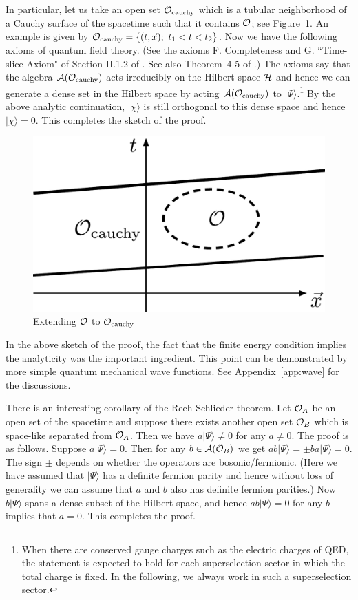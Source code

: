 \documentclass[12pt,a4paper]{article}
\theoremstyle{plain}
\theoremstyle{definition}
\numberwithin{thm}{section}
\newcommand{\ket}[1]{ | {#1} \rangle }
\def\CA{{\cal A}}
\def\CH{{\cal H}}
\def\CO{{\cal O}}
\begin{document}
In particular, let us take an open set $\CO_{\rm cauchy}$ which is a tubular neighborhood of a Cauchy surface of the spacetime
such that it contains $\CO$; see Figure~\ref{fig:cauchy}. 
An example is given by $\CO_{\rm cauchy}=\{ (t, \vec{x});~ t_1 < t <t_2 \}$.
Now we have the following axioms of quantum field theory. 
(See the axioms F. Completeness and G. ``Time-slice Axiom" of Section II.1.2 of \cite{Haag:1992hx}. See also
Theorem~4-5 of \cite{Streater:1989vi}.)
The axioms say that the algebra $\CA(\CO_{\rm cauchy})$ acts irreducibly on the Hilbert space $\CH$ and hence we can generate a dense set
in the Hilbert space by acting $\CA(\CO_{\rm cauchy})$ to $\ket{\Psi}$.\footnote{When there are conserved gauge charges such as the electric charges of QED,
the statement is expected to hold for each superselection sector in which the total charge is fixed. In the following, we always work in such
a superselection sector.}
By the above analytic continuation,
$\ket{\chi}$ is still orthogonal to this dense space and hence $\ket{\chi}=0$. This completes the sketch of the proof.
\begin{figure}
\centering
\includegraphics[width=.35\textwidth]{cauchy}
\caption{Extending $\CO$ to $\CO_{\rm cauchy}$ \label{fig:cauchy}}
\end{figure}

In the above sketch of the proof, the fact that the finite energy condition implies the analyticity was the important ingredient.
This point can be demonstrated by more simple quantum mechanical wave functions. See Appendix~\ref{app:wave} for the discussions.


There is an interesting corollary of the Reeh-Schlieder theorem.
Let $\CO_A$ be an open set of the spacetime and suppose there exists another open set $\CO_B$ which is space-like separated from $\CO_A$.
Then we have $a\ket{\Psi} \neq 0$ for any $a \neq 0$. The proof is as follows. Suppose $a\ket{\Psi}=0$. Then for any $b \in \CA(\CO_B)$
we get $ab\ket{\Psi}=\pm ba\ket{\Psi} = 0$. The sign $ \pm$ depends on whether the operators are bosonic/fermionic.
(Here we have assumed that $\ket{\Psi}$ has a definite fermion parity and hence without loss of generality we can assume that $a$ and $b$
also has definite fermion parities.) Now $b\ket{\Psi}$ spans a dense subset of the Hilbert space, and hence $ab\ket{\Psi}=0$ for any $b$
implies that $a=0$. This completes the proof.
\end{document}
